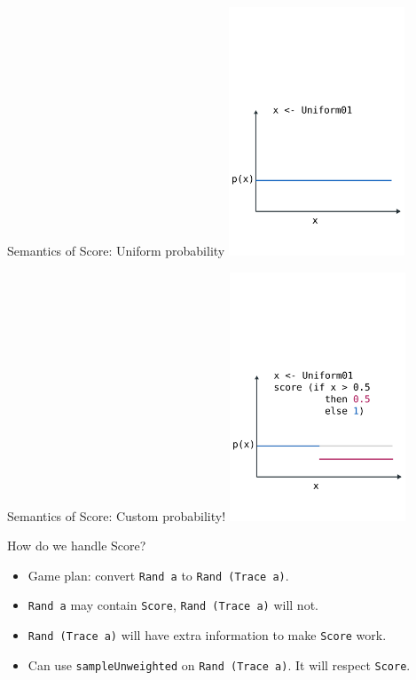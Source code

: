 \documentclass{beamer}
\newenvironment{code}{\VerbatimEnvironment \begin{verbatim}}{\end{verbatim}}
\newcommand{\hsmint}[1]{\texttt{#1}}
\begin{document}


\begin{frame}[fragile]{Semantics of Score: Uniform probability}
    \includegraphics[height=280px]{res/uniform-PDF.pdf}
\end{frame}

\begin{frame}[fragile]{Semantics of Score: Custom probability!}
    \includegraphics[height=280px]{res/MCMC-1.pdf}
\end{frame}

\begin{frame}[fragile]{How do we handle Score?}
    \begin{itemize}
        \item Game plan: convert \hsmint{Rand a} to \hsmint{Rand (Trace a)}.
        \item \hsmint{Rand a} may contain \hsmint{Score}, \hsmint{Rand (Trace a)} will not.
        \item \hsmint{Rand (Trace a)} will have extra information to make \hsmint{Score} work.
        \item Can use \hsmint{sampleUnweighted} on \hsmint{Rand (Trace a)}. It will respect \hsmint{Score}.
\end{itemize}
\end{frame}
\end{document}

